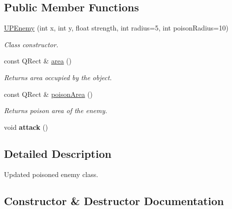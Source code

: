 \subsection*{Public Member Functions}
\begin{DoxyCompactItemize}
\item 
\hyperlink{classUPEnemy_a865c439af7c5fc9893eb9a95e08eae26}{U\+P\+Enemy} (int x, int y, float strength, int radius=5, int poison\+Radius=10)
\begin{DoxyCompactList}\small\item\em Class constructor. \end{DoxyCompactList}\item 
const Q\+Rect \& \hyperlink{classUPEnemy_aa87ac038b30dccbad0a0966824d99382}{area} ()\hypertarget{classUPEnemy_aa87ac038b30dccbad0a0966824d99382}{}\label{classUPEnemy_aa87ac038b30dccbad0a0966824d99382}

\begin{DoxyCompactList}\small\item\em Returns area occupied by the object. \end{DoxyCompactList}\item 
const Q\+Rect \& \hyperlink{classUPEnemy_a88cc91ecae7705053e6cfbab57f60503}{poison\+Area} ()\hypertarget{classUPEnemy_a88cc91ecae7705053e6cfbab57f60503}{}\label{classUPEnemy_a88cc91ecae7705053e6cfbab57f60503}

\begin{DoxyCompactList}\small\item\em Returns poison area of the enemy. \end{DoxyCompactList}\item 
void {\bfseries attack} ()\hypertarget{classUPEnemy_aa1145894e8e7c203796e653309fdb661}{}\label{classUPEnemy_aa1145894e8e7c203796e653309fdb661}

\end{DoxyCompactItemize}


\subsection{Detailed Description}
Updated poisoned enemy class. 

\subsection{Constructor \& Destructor Documentation}

